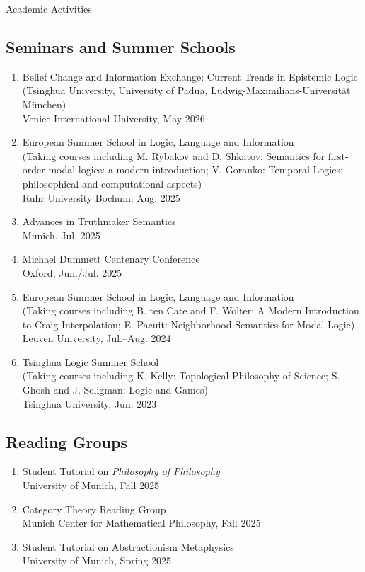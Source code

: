 \documentclass{resume}
\begin{document}
\begin{rSection}{Academic Activities}
\subsection*{Seminars and Summer Schools}
\begin{enumerate}
\item Belief Change and Information Exchange: Current Trends in Epistemic Logic (Tsinghua University, University of Padua, Ludwig-Maximilians-Universität München)
\\ \null\hfill Venice International University, May 2026
\item European Summer School in Logic, Language and Information
\\ (Taking courses including M. Rybakov and D. Shkatov: Semantics for first-order modal logics: a modern introduction; V. Goranko: Temporal Logics: philosophical and computational aspects)
\\ \null\hfill Ruhr University Bochum, Aug. 2025
\item Advances in Truthmaker Semantics
\\ \null\hfill Munich, Jul. 2025
\item Michael Dummett Centenary Conference
\\ \null\hfill Oxford, Jun./Jul. 2025
\item European Summer School in Logic, Language and Information
\\ (Taking courses including B. ten Cate and F. Wolter: A Modern Introduction to Craig Interpolation; E. Pacuit: Neighborhood Semantics for Modal Logic)
\\ \null\hfill Leuven University, Jul.--Aug. 2024
\item Tsinghua Logic Summer School
\\ (Taking courses including K. Kelly: Topological Philosophy of Science; S. Ghosh and J. Seligman: Logic and Games)
\\ \null\hfill Tsinghua University, Jun. 2023
\end{enumerate}

\subsection*{Reading Groups}
\begin{enumerate}
\item Student Tutorial on \textit{Philosophy of Philosophy}
\\ \null\hfill University of Munich, Fall 2025
\item Category Theory Reading Group
\\ \null\hfill Munich Center for Mathematical Philosophy, Fall 2025
\item Student Tutorial on Abstractionism Metaphysics
\\ \null\hfill University of Munich, Spring 2025
\end{enumerate}
\end{rSection}
\end{document}
